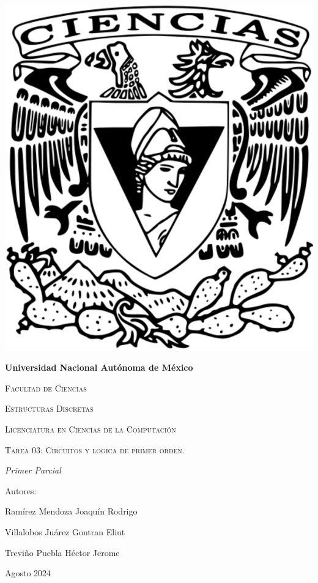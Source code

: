 \documentclass[oneside]{book}
\begin{document}
\begin{titlepage}
\begin{minipage}{10cm}
	\end{minipage}\hfill
	\begin{minipage}{3cm}
		\begin{center}
			\includegraphics[height = 0.14\textheight]{recursos/Logo_FC.png}\par
		\end{center}
	\end{minipage}
	\centering
	\vspace{1cm}

	{\bfseries\LARGE Universidad Nacional Autónoma de México \par}

	\vspace{1cm}
	{\scshape\Large Facultad de Ciencias \par}
	\vspace{1cm}
	{\scshape\Large Estructuras Discretas \par}
	\vspace{1cm}
	{\scshape\Large Licenciatura en Ciencias de la Computación \par}
	\vspace{1cm}
	{\scshape\Huge Tarea 03: Circuitos y logica de primer orden.  \par}
	\vspace{3cm}
	{\itshape\Large Primer Parcial \par}
	\vfill
	{\Large Autores: \par}
	{\Large Ramírez Mendoza Joaquín Rodrigo \par}
	{\Large Villalobos Juárez Gontran Eliut\par}
	{\Large Treviño Puebla Héctor Jerome \par}
	\vfill
	{\Large Agosto 2024 \par}
\end{titlepage}
\end{document}
